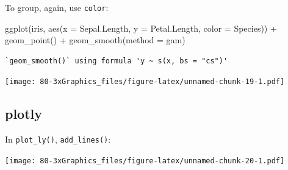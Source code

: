 \documentclass[
]{book}
\newenvironment{Shaded}{\begin{snugshade}}{\end{snugshade}}
\newcommand{\AttributeTok}[1]{\textcolor[rgb]{0.77,0.63,0.00}{#1}}
\newcommand{\FunctionTok}[1]{\textcolor[rgb]{0.00,0.00,0.00}{#1}}
\newcommand{\NormalTok}[1]{#1}
\newcommand{\OtherTok}[1]{\textcolor[rgb]{0.56,0.35,0.01}{#1}}
\newcommand{\SpecialCharTok}[1]{\textcolor[rgb]{0.00,0.00,0.00}{#1}}
\newcommand{\StringTok}[1]{\textcolor[rgb]{0.31,0.60,0.02}{#1}}
\begin{document}
To group, again, use \texttt{color}:

\begin{Shaded}
\begin{Highlighting}[]
\FunctionTok{ggplot}\NormalTok{(iris, }\FunctionTok{aes}\NormalTok{(}\AttributeTok{x =}\NormalTok{ Sepal.Length, }\AttributeTok{y =}\NormalTok{ Petal.Length, }\AttributeTok{color =}\NormalTok{ Species)) }\SpecialCharTok{+}
  \FunctionTok{geom\_point}\NormalTok{() }\SpecialCharTok{+}
  \FunctionTok{geom\_smooth}\NormalTok{(}\AttributeTok{method =} \StringTok{\textquotesingle{}gam\textquotesingle{}}\NormalTok{)}
\end{Highlighting}
\end{Shaded}

\begin{verbatim}
`geom_smooth()` using formula 'y ~ s(x, bs = "cs")'
\end{verbatim}

\texttt{[image: 80-3xGraphics\_files/figure-latex/unnamed-chunk-19-1.pdf]}

\hypertarget{plotly-1}{%
\subsection{\texorpdfstring{\textbf{plotly}}{plotly}}\label{plotly-1}}

In \texttt{plot\_ly()}, \texttt{add\_lines()}:

\begin{Shaded}
\end{Shaded}

\texttt{[image: 80-3xGraphics\_files/figure-latex/unnamed-chunk-20-1.pdf]}
\end{document}
